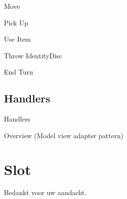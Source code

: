 \documentclass[11pt,t]{beamer}
\begin{document}
\begin{frame}{Move}
\end{frame}

\begin{frame}{Pick Up}
\end{frame}

\begin{frame}{Use Item}
\end{frame}

\begin{frame}{Throw IdentityDisc}
\end{frame}

\begin{frame}{End Turn}
\end{frame}

\subsection{Handlers}

\begin{frame}{Handlers}
\end{frame}

\begin{frame}{Overview (Model view adapter pattern)}

\end{frame}
\section{Slot}
\begin{frame}
\vspace{1.5in}
\begin{center}
Bedankt voor uw aandacht.
\end{center}
\end{frame}
\end{document}
